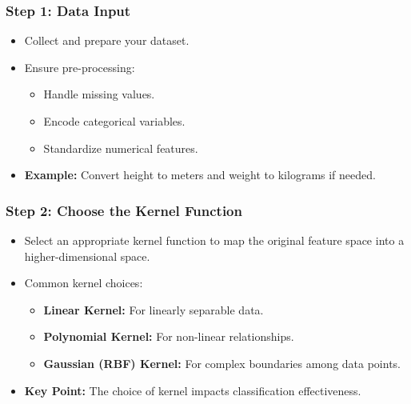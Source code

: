 \documentclass{beamer}
\begin{document}
\begin{frame}[fragile]
    \frametitle{Step 1: Data Input}
    \begin{itemize}
        \item Collect and prepare your dataset.
        \item Ensure pre-processing:
        \begin{itemize}
            \item Handle missing values.
            \item Encode categorical variables.
            \item Standardize numerical features.
        \end{itemize}
        \item \textbf{Example:} Convert height to meters and weight to kilograms if needed.
    \end{itemize}
\end{frame}

\begin{frame}[fragile]
    \frametitle{Step 2: Choose the Kernel Function}
    \begin{itemize}
        \item Select an appropriate kernel function to map the original feature space into a higher-dimensional space.
        \item Common kernel choices:
        \begin{itemize}
            \item \textbf{Linear Kernel:} For linearly separable data.
            \item \textbf{Polynomial Kernel:} For non-linear relationships.
            \item \textbf{Gaussian (RBF) Kernel:} For complex boundaries among data points.
        \end{itemize}
        \item \textbf{Key Point:} The choice of kernel impacts classification effectiveness.
    \end{itemize}
\end{frame}
\end{document}
